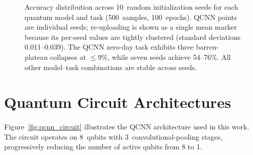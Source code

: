 \begin{figure}[ht]
\caption{Accuracy distribution across 10~random initialization seeds for each quantum model and task (500~samples, 100~epochs). QCNN points are individual seeds; re-uploading is shown as a single mean marker because its per-seed values are tightly clustered (standard deviations 0.011--0.039). The QCNN zero-day task exhibits three barren-plateau collapses at $\leq 9\%$, while seven seeds achieve 54--76\%. All other model--task combinations are stable across seeds.}
\label{fig:seed_box}
\end{figure}


\section{Quantum Circuit Architectures}
\label{app:circuits}

Figure~\ref{fig:qcnn_circuit} illustrates the QCNN architecture used in this work. The circuit operates on 8~qubits with 3~convolutional-pooling stages, progressively reducing the number of active qubits from 8 to 1.

